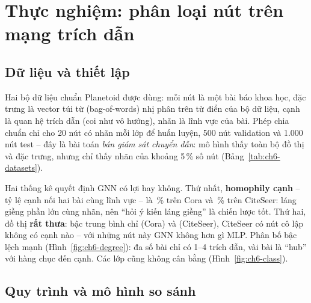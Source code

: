 \section{Thực nghiệm: phân loại nút trên mạng trích dẫn}
\label{sec:gnn-exp}

\subsection{Dữ liệu và thiết lập}

Hai bộ dữ liệu chuẩn Planetoid \cite{ch6:sen2008,ch6:yang2016} được dùng: mỗi nút là một bài báo khoa học, đặc trưng là
vector túi từ (bag-of-words) nhị phân trên từ điển của bộ dữ liệu, cạnh là quan hệ trích dẫn (coi như vô hướng), nhãn là
lĩnh vực của bài. Phép chia chuẩn chỉ cho 20 nút có nhãn mỗi lớp để huấn luyện, 500 nút validation và 1.000 nút test --
đây là bài toán \emph{bán giám sát chuyển dẫn}: mô hình thấy toàn bộ đồ thị và đặc trưng, nhưng chỉ thấy nhãn của khoảng
5\,\% số nút (Bảng~\ref{tab:ch6-datasets}).


Hai thống kê quyết định GNN có lợi hay không. Thứ nhất, \textbf{homophily cạnh} -- tỷ lệ cạnh nối hai bài cùng lĩnh vực
-- là \,\% trên Cora và \,\% trên CiteSeer: láng giềng
phần lớn cùng nhãn, nên ``hỏi ý kiến láng giềng'' là chiến lược tốt. Thứ hai, đồ thị \textbf{rất thưa}: bậc trung bình
chỉ  (Cora) và  (CiteSeer), CiteSeer có
 nút cô lập không có cạnh nào -- với những nút này GNN không hơn gì MLP. Phân bố bậc lệch
mạnh (Hình~\ref{fig:ch6-degree}): đa số bài chỉ có 1--4 trích dẫn, vài bài là ``hub'' với hàng chục đến
 cạnh. Các lớp cũng không cân bằng (Hình~\ref{fig:ch6-class}).


\subsection{Quy trình và mô hình so sánh}

